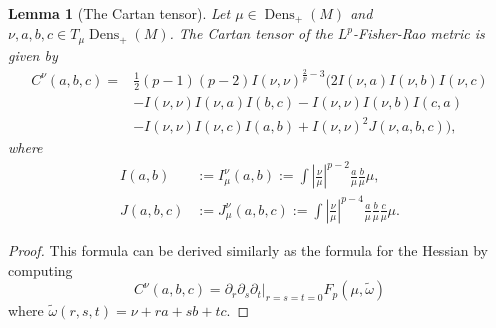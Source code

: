 \documentclass[11pt]{amsart}
\newtheorem{lemma}[theorem]{Lemma}
\theoremstyle{definition}
\newcommand{\Abs}[1]{\left|#1\right|}
\newcommand{\Dens}{\operatorname{Dens}_+(M)}
\begin{document}
\begin{lemma}[The Cartan tensor]
    Let $\mu\in\Dens$ and $\nu,a,b,c\in T_\mu\Dens$. The Cartan tensor  of the $L^p$-Fisher-Rao metric is given by
    \begin{equation}\label{cartan-tensor}
        \begin{aligned}
        C^\nu(a,b,c) =& \frac{1}{2}(p-1)(p-2)I(\nu,\nu)^{\frac{2}{p}-3}\Big(2I(\nu,a)I(\nu,b)I(\nu,c) \\
        &- I(\nu,\nu)I(\nu,a)I(b,c) - I(\nu,\nu)I(\nu,b)I(c,a)\\
        &- I(\nu,\nu)I(\nu,c)I(a,b) + I(\nu,\nu)^2J(\nu,a,b,c)\Big),
        \end{aligned}
    \end{equation}
    where
    \begin{equation}\label{h-and-l}
    \begin{aligned}
        I(a,b)&:=I_\mu^\nu(a,b):=\int \Abs{\frac{\nu}{\mu}}^{p-2}\frac{a}{\mu}\frac{b}{\mu}\mu,\\
        J(a,b,c)&:=J_\mu^\nu(a,b,c):=\int\Abs{\frac{\nu}{\mu}}^{p-4}\frac{a}{\mu}\frac{b}{\mu}\frac{c}{\mu}\mu.
    \end{aligned}
    \end{equation}
\end{lemma}
\begin{proof}
This formula can be derived similarly as the formula for the Hessian
by computing
$$C^\nu(a,b,c)=\left.\partial_r\partial_s\partial_t\right|_{r=s=t=0}F_p(\mu,\tilde\omega)$$
where $\tilde \omega(r,s,t)=\nu+ra+sb+tc$.
\end{proof}
\end{document}
